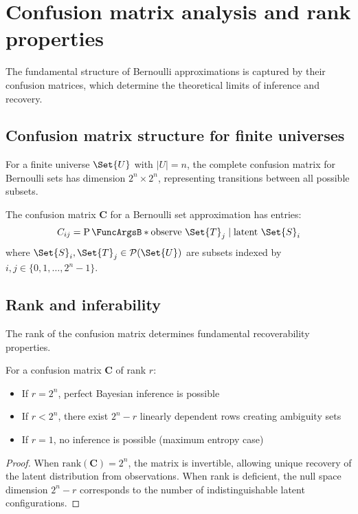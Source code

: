 \documentclass[ ../main.tex]{subfiles}
\begin{document}
\section{Confusion matrix analysis and rank properties}
\label{sec:confusion_matrix}

The fundamental structure of Bernoulli approximations is captured by their confusion matrices, which determine the theoretical limits of inference and recovery.

\subsection{Confusion matrix structure for finite universes}

For a finite universe $\Set{U}$ with $|U| = n$, the complete confusion matrix for Bernoulli sets has dimension $2^n \times 2^n$, representing transitions between all possible subsets.

\begin{definition}
The confusion matrix $\mathbf{C}$ for a Bernoulli set approximation has entries:
\begin{equation}
C_{ij} = \Prob{\text{observe } \Set{T}_j \mid \text{latent } \Set{S}_i}
\end{equation}
where $\Set{S}_i, \Set{T}_j \in \mathcal{P}(\Set{U})$ are subsets indexed by $i,j \in \{0, 1, \ldots, 2^n-1\}$.
\end{definition}

\subsection{Rank and inferability}

The rank of the confusion matrix determines fundamental recoverability properties.

\begin{theorem}
\label{thm:rank_inference}
For a confusion matrix $\mathbf{C}$ of rank $r$:
\begin{itemize}
\item If $r = 2^n$, perfect Bayesian inference is possible
\item If $r < 2^n$, there exist $2^n - r$ linearly dependent rows creating ambiguity sets
\item If $r = 1$, no inference is possible (maximum entropy case)
\end{itemize}
\end{theorem}

\begin{proof}
When $\text{rank}(\mathbf{C}) = 2^n$, the matrix is invertible, allowing unique recovery of the latent distribution from observations. When rank is deficient, the null space dimension $2^n - r$ corresponds to the number of indistinguishable latent configurations.
\end{proof}
\end{document}
